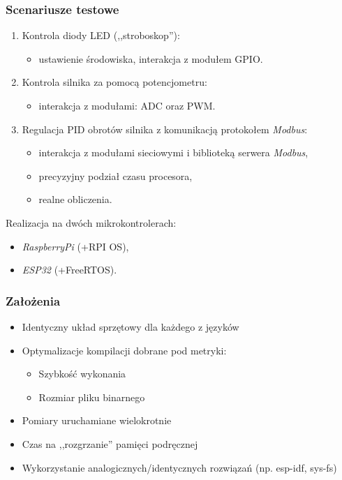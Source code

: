 \documentclass{beamer}
\newcommand{\Esp}{\emph{ESP32}}
\newcommand{\Rpi}{\emph{RaspberryPi}}
\newcommand{\Modbus}{\emph{Modbus}}
\begin{document}
\begin{frame}
	\frametitle{Scenariusze testowe}
	\begin{enumerate}
		\item Kontrola diody LED (,,stroboskop''):
		      \begin{itemize}
			      \item ustawienie środowiska, interakcja z modułem GPIO.
		      \end{itemize}
		\item Kontrola silnika za pomocą potencjometru:
		      \begin{itemize}
			      \item interakcja z modułami: ADC oraz PWM.
		      \end{itemize}
		\item Regulacja PID obrotów silnika z komunikacją protokołem \Modbus{}:
		      \begin{itemize}
			      \item interakcja z modułami sieciowymi i biblioteką serwera \Modbus{},
			      \item precyzyjny podział czasu procesora,
			      \item realne obliczenia.
		      \end{itemize}
	\end{enumerate}

	Realizacja na dwóch mikrokontrolerach:
	\begin{multicols}{2}
		\begin{itemize}
			\item \Rpi{} (+RPI OS),
			\item \Esp{} (+FreeRTOS).
		\end{itemize}
	\end{multicols}
\end{frame}

\begin{frame}
	\frametitle{Założenia}
	\begin{itemize}
		\item Identyczny układ sprzętowy dla każdego z języków
		\item Optymalizacje kompilacji dobrane pod metryki:
		      \begin{itemize}
			      \item Szybkość wykonania
			      \item Rozmiar pliku binarnego
		      \end{itemize}
		\item Pomiary uruchamiane wielokrotnie
		\item Czas na ,,rozgrzanie'' pamięci podręcznej
		\item Wykorzystanie analogicznych/identycznych rozwiązań (np. esp-idf, sys-fs)
	\end{itemize}
\end{frame}
\end{document}
